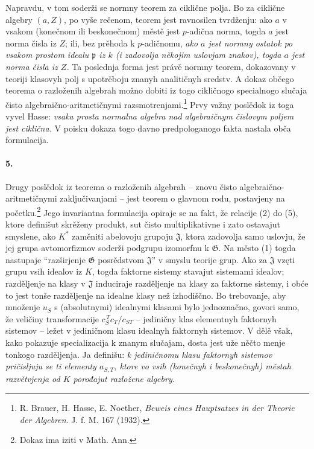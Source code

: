 \documentclass[11pt]{article}
\newcommand{\foreign}[1]{#1}
\begin{document}
Napravdu, v tom soderži se normny teorem za ciklične polja. Bo za ciklične algebry \((a,Z)\), po vyše rečenom, teorem jest ravnosilen tvrdženju: ako \(a\) v vsakom (konečnom ili beskonečnom) městě jest \(p\)-adična norma, togda \(a\) jest norma čisla iz \(Z\); ili, bez prěhoda k \(p\)-adičnomu, \emph{ako \(a\) jest normny ostatok po vsakom prostom idealu \(\mathfrak p\) iz \(k\) (i zadovolja někojim uslovjam znakov), togda \(a\) jest norma čisla iz \(Z\).} Ta poslednja forma jest právě normny teorem, dokazovany v teoriji klasovyh polj s upotrěboju znanyh analitičnyh sredstv. A dokaz občego teorema o razloženih algebrah možno dobiti iz togo cikličnogo specialnogo slučaja čisto algebraično-aritmetičnymi razsmotrenjami.\footnote{R. Brauer, H. Hasse, E. Noether, \foreign{\emph{Beweis eines Hauptsatzes in der Theorie der Algebren}}. J. f. M. 167 (1932).} Prvy važny poslědok iz toga vyvel Hasse: \emph{vsaka prosta normalna algebra nad algebraičnym čislovym poljem jest ciklična.} V poisku dokaza togo davno predpologanogo fakta nastala obča formulacija.

\paragraph{5.}
Drugy poslědok iz teorema o razloženih algebrah -- znovu čisto algebraično-aritmetičnymi zaključivanjami -- jest teorem o glavnom rodu, postavjeny na početku.\footnote{Dokaz ima iziti v \foreign{Math. Ann.}} Jego invariantna formulacija opiraje se na fakt, že relacije (2) do (5), ktore definišut skrěženy produkt, sut čisto multiplikativne i zato ostavajut smyslene, ako \(K^\ast\) zaměniti abelovoju grupoju \(\mathfrak J\), ktora zadovolja samo uslovju, že jej grupa avtomorfizmov soderži podgrupu izomorfnu k \(\mathfrak G\). Na město (1) togda nastupaje ``razširjenje \(\mathfrak G\) posrědstvom \(\mathfrak J\)'' v smyslu teorije grup. Ako za \(\mathfrak J\) vzęti grupu vsih idealov iz \(K\), togda faktorne sistemy stavajut sistemami idealov; razděljenje na klasy v \(\mathfrak J\) induciraje razděljenje na klasy za faktorne sistemy, i obće to jest tonše razděljenje na idealne klasy než izhodiščno. Bo trebovanje, aby množenje \(u_S\) s (absolutnymi) idealnymi klasami bylo jednoznačno, govori samo, že veličiny transformacije \(c_S^{\,T}c_T/c_{ST}\) -- jediničny klas elementnyh faktornyh sistemov -- ležet v jediničnom klasu idealnyh faktornyh sistemov. V dělě však, kako pokazuje specializacija k znanym slučajam, dosta jest uže něčto menje tonkogo razděljenja. Ja definišu: \emph{k jediničnomu klasu faktornyh sistemov pričisljuju se ti elementy \(a_{S,T}\), ktore vo vsih (konečnyh i beskonečnyh) městah razvětvjenja od \(K\) porođajut razložene algebry.}
\end{document}
